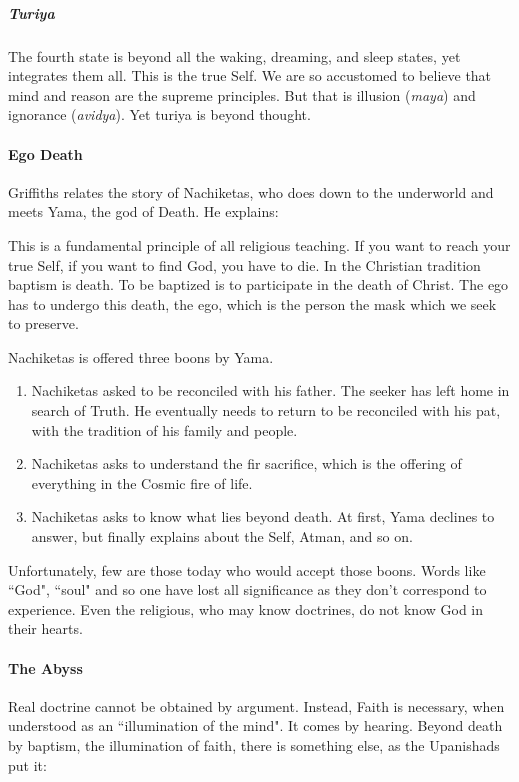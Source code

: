 \subparagraph{Turiya}
The fourth state is beyond all the waking, dreaming, and sleep states, yet integrates them all. This is the true Self. We are so accustomed to believe that mind and reason are the supreme principles. But that is illusion (\emph{maya}) and ignorance (\emph{avidya}). Yet turiya is beyond thought.

\paragraph{Ego Death}
Griffiths relates the story of Nachiketas, who does down to the underworld and meets Yama, the god of Death. He explains:

\begin{quotex}
This is a fundamental principle of all religious teaching. If you want to reach your true Self, if you want to find God, you have to die. In the Christian tradition baptism is death. To be baptized is to participate in the death of Christ. The ego has to undergo this death, the ego, which is the person the mask which we seek to preserve. 

\end{quotex}
Nachiketas is offered three boons by Yama.

\begin{enumerate}
\item Nachiketas asked to be reconciled with his father. The seeker has left home in search of Truth. He eventually needs to return to be reconciled with his pat, with the tradition of his family and people. 
\item Nachiketas asks to understand the fir sacrifice, which is the offering of everything in the Cosmic fire of life. 
\item Nachiketas asks to know what lies beyond death. At first, Yama declines to answer, but finally explains about the Self, Atman, and so on. 
\end{enumerate}
Unfortunately, few are those today who would accept those boons. Words like ``God", ``soul" and so one have lost all significance as they don't correspond to experience. Even the religious, who may know doctrines, do not know God in their hearts.

\paragraph{The Abyss}
Real doctrine cannot be obtained by argument. Instead, Faith is necessary, when understood as an ``illumination of the mind". It comes by hearing. Beyond death by baptism, the illumination of faith, there is something else, as the Upanishads put it:


